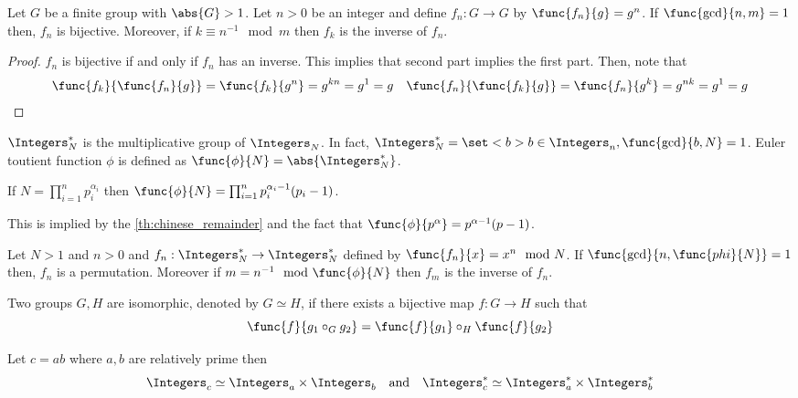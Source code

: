 \begin{corollary}
    Let \(G\) be a finite group with \(\abs{G} > 1\). Let \(n > 0\) be an integer and define \(f_n : G \to G\) by \(\func{f_n}{g} = g^n\). If \(\func{\gcd}{n,m} = 1\) then, \(f_n\) is bijective. Moreover, if \(k \equiv n^{-1} \mod m\) then \(f_k\) is the inverse of \(f_n\).
\end{corollary}
\begin{proof}
    \(f_n\) is bijective if and only if \(f_n\) has an inverse. This implies that second part implies the first part. Then, note that 
    \begin{align*}
        &\func{f_k}{\func{f_n}{g}}= \func{f_k}{g^n} = g^{kn} = g^1 = g
        &\func{f_n}{\func{f_k}{g}}= \func{f_n}{g^k} = g^{nk} = g^1 = g
    \end{align*}
\end{proof}

\(\Integers_N^{\ast}\) is the multiplicative group of \(\Integers_N\). In fact, \(\Integers_N^{\ast} = \set<b>{b \in \Integers_n , \func{\gcd}{b,N} = 1}\). Euler toutient function \(\phi\) is defined as \(\func{\phi}{N} = \abs{\Integers_N^{\ast}}\).
\begin{proposition}
    If \(N = \prod_{i = 1}^n p_i^{\alpha_i}\) then \(\func{\phi}{N} = \prod_{i =1}^n p_i^{\alpha_i - 1} (p_i - 1)\). 
\end{proposition}
\begin{proposition}
    This is implied by the \ref{th:chinese_remainder} and the fact that \(\func{\phi}{p^{\alpha}} = p^{\alpha - 1} (p - 1)\).
\end{proposition}

\begin{corollary}
    Let \(N > 1\) and \(n > 0\) and \(f_n : \Integers_N^{\ast} \to \Integers_N^{\ast}\) defined by \(\func{f_n}{x} = x^n \mod N\). If \(\func{\gcd}{n,\func{phi}{N}} = 1\) then, \(f_n\) is a permutation. Moreover if \(m = n^{-1} \mod \func{\phi}{N}\) then \(f_m\) is the inverse of \(f_n\).
\end{corollary}

Two groups \(G,H\) are isomorphic, denoted by \(G \simeq H\), if there exists a bijective map \(f : G \to H\) such that 
\begin{equation*}
    \func{f}{g_1 \circ_G g_2} = \func{f}{g_1} \circ_H \func{f}{g_2}
\end{equation*}

\begin{theorem}\label{th:chinese_remainder}
    Let \(c = ab\) where \(a,b\) are relatively prime then 
    \begin{equation*}
        \Integers_c \simeq \Integers_a \times \Integers_b \quad \text{and} \quad \Integers_c^{\ast} \simeq \Integers_a^{\ast}  \times \Integers_b^{\ast}  
    \end{equation*}
\end{theorem}


